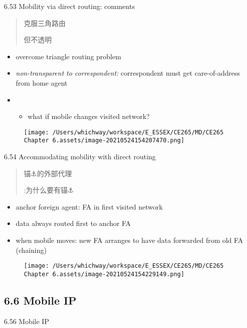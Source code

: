 \documentclass[
]{article}
\begin{document}
6.53 Mobility via direct routing: comments

\begin{quote}
克服三角路由

但不透明
\end{quote}

\begin{itemize}
\item
  overcome triangle routing problem
\item
  \emph{non-transparent to correspondent:} correspondent must get
  care-of-address from home agent
\item
  \begin{itemize}
  \item
    what if mobile changes visited network?
  \end{itemize}
\end{itemize}

\begin{figure}
\centering
\texttt{[image: /Users/whichway/workspace/E\_ESSEX/CE265/MD/CE265 Chapter 6.assets/image-20210524154207470.png]}
\caption{}
\end{figure}

6.54 Accommodating mobility with direct routing

\begin{quote}
锚⚓️的外部代理

:为什么要有锚⚓️
\end{quote}

\begin{itemize}
\item
  anchor foreign agent: FA in first visited network
\item
  data always routed first to anchor FA
\item
  when mobile moves: new FA arranges to have data forwarded from old FA
  (chaining)
\end{itemize}

\begin{figure}
\centering
\texttt{[image: /Users/whichway/workspace/E\_ESSEX/CE265/MD/CE265 Chapter 6.assets/image-20210524154229149.png]}
\caption{}
\end{figure}

\hypertarget{66-mobile-ip}{%
\subsection{6.6 Mobile IP}\label{66-mobile-ip}}

6.56 Mobile IP
\end{document}
